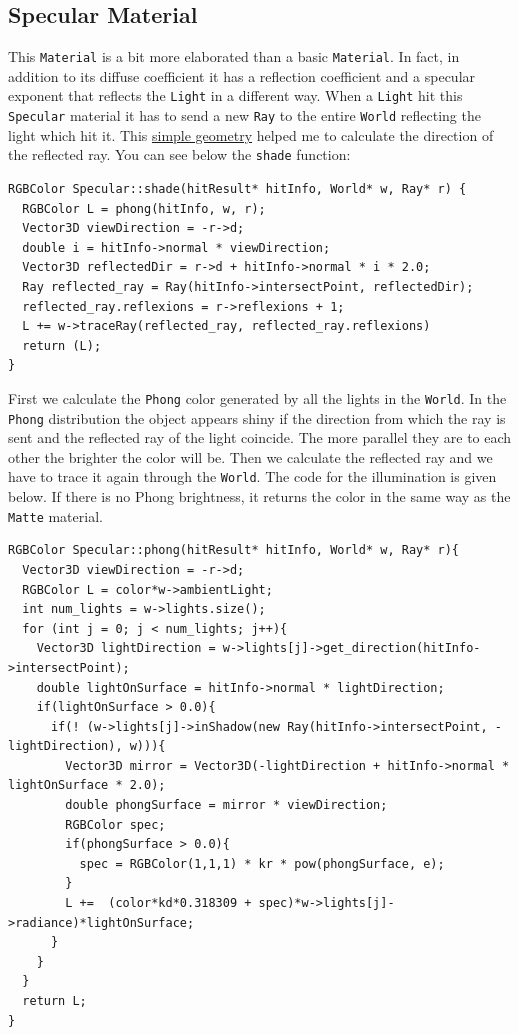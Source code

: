 \documentclass[a4paper,11.5pt]{article}
\theoremstyle{mytheor}
\begin{document}
\subsection{Specular Material}
This \texttt{Material} is a bit more elaborated than a basic \texttt{Material}. In fact, in addition to its diffuse coefficient it has a reflection coefficient and a specular exponent that reflects the \texttt{Light} in a different way. When a \texttt{Light} hit this \texttt{Specular} material it has to send a new \texttt{Ray} to the entire \texttt{World} reflecting the light which hit it. This \href{http://paulbourke.net/geometry/reflected/}{simple geometry} helped me to calculate the direction of the reflected ray. You can see below the \texttt{shade} function:
\begin{lstlisting}
RGBColor Specular::shade(hitResult* hitInfo, World* w, Ray* r) {
  RGBColor L = phong(hitInfo, w, r);
  Vector3D viewDirection = -r->d;
  double i = hitInfo->normal * viewDirection;
  Vector3D reflectedDir = r->d + hitInfo->normal * i * 2.0;
  Ray reflected_ray = Ray(hitInfo->intersectPoint, reflectedDir);
  reflected_ray.reflexions = r->reflexions + 1;
  L += w->traceRay(reflected_ray, reflected_ray.reflexions)
  return (L);
}
\end{lstlisting} 
First we calculate the \texttt{Phong} color generated by all the lights in the \texttt{World}. In the \texttt{Phong} distribution the object appears shiny if the direction from which the ray is sent and the reflected ray of the light coincide. The more parallel they are to each other the brighter the color will be. Then we calculate the reflected ray and we have to trace it again through the \texttt{World}. The code for the  illumination is given below. If there is no Phong brightness, it returns the color in the same way as the \texttt{Matte} material.
\begin{lstlisting}
RGBColor Specular::phong(hitResult* hitInfo, World* w, Ray* r){
  Vector3D viewDirection = -r->d;
  RGBColor L = color*w->ambientLight;
  int num_lights = w->lights.size();
  for (int j = 0; j < num_lights; j++){
    Vector3D lightDirection = w->lights[j]->get_direction(hitInfo->intersectPoint);
    double lightOnSurface = hitInfo->normal * lightDirection;
    if(lightOnSurface > 0.0){
      if(! (w->lights[j]->inShadow(new Ray(hitInfo->intersectPoint, -lightDirection), w))){
        Vector3D mirror = Vector3D(-lightDirection + hitInfo->normal * lightOnSurface * 2.0);
        double phongSurface = mirror * viewDirection;
        RGBColor spec;
        if(phongSurface > 0.0){
          spec = RGBColor(1,1,1) * kr * pow(phongSurface, e);
        }
        L +=  (color*kd*0.318309 + spec)*w->lights[j]->radiance)*lightOnSurface;
      }
    }
  }
  return L;
}
\end{lstlisting}
\end{document}
